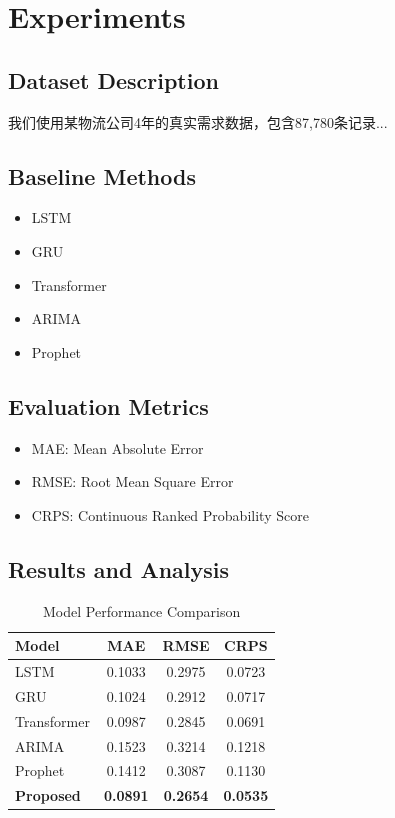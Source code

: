 \documentclass[review]{elsarticle}
\begin{document}
\section{Experiments}
\label{sec:experiments}

\subsection{Dataset Description}
我们使用某物流公司4年的真实需求数据，包含87,780条记录...

\subsection{Baseline Methods}
\begin{itemize}
    \item LSTM~\cite{lstm}
    \item GRU~\cite{gru}
    \item Transformer~\cite{transformer}
    \item ARIMA~\cite{arima}
    \item Prophet~\cite{prophet}
\end{itemize}

\subsection{Evaluation Metrics}
\begin{itemize}
    \item MAE: Mean Absolute Error
    \item RMSE: Root Mean Square Error
    \item CRPS: Continuous Ranked Probability Score
\end{itemize}

\subsection{Results and Analysis}

\begin{table}[ht]
\centering
\caption{Model Performance Comparison}
\label{tab:results}
\begin{tabular}{lccc}
\toprule
\textbf{Model} & \textbf{MAE} & \textbf{RMSE} & \textbf{CRPS} \\
\midrule
LSTM & 0.1033 & 0.2975 & 0.0723 \\
GRU & 0.1024 & 0.2912 & 0.0717 \\
Transformer & 0.0987 & 0.2845 & 0.0691 \\
ARIMA & 0.1523 & 0.3214 & 0.1218 \\
Prophet & 0.1412 & 0.3087 & 0.1130 \\
\textbf{Proposed} & \textbf{0.0891} & \textbf{0.2654} & \textbf{0.0535} \\
\bottomrule
\end{tabular}
\end{table}
\end{document}
